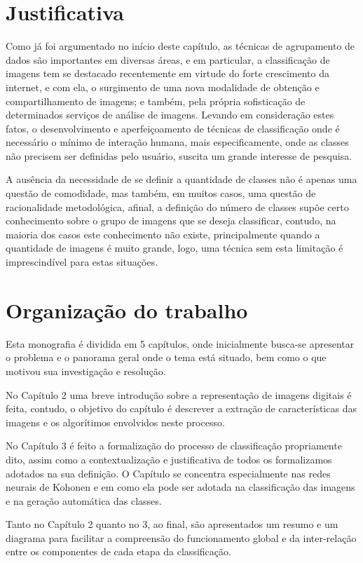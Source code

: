 \section{Justificativa}

Como já foi argumentado no início deste capítulo, as técnicas de agrupamento de
dados são importantes em diversas áreas, e em particular, a classificação de
imagens tem se destacado recentemente em virtude do forte crescimento da
internet, e com ela, o surgimento de uma nova modalidade de obtenção e
compartilhamento de imagens; e também, pela própria sofisticação de determinados
serviços de análise de imagens. Levando em consideração estes fatos, o
desenvolvimento e aperfeiçoamento de técnicas de classificação onde é necessário
o mínimo de interação humana, mais especificamente, onde as classes não precisem
ser definidas pelo usuário, suscita um grande interesse de pesquisa.

A ausência da necessidade de se definir a quantidade de classes não é apenas
uma questão de comodidade, mas também, em muitos casos, uma questão de
racionalidade metodológica, afinal, a definição do número de classes supõe certo
conhecimento sobre o grupo de imagens que se deseja classificar, contudo, na
maioria dos casos este conhecimento não existe, principalmente quando a
quantidade de imagens é muito grande, logo, uma técnica sem esta limitação é
imprescindível para estas situações.

\section{Organização do trabalho}

Esta monografia é dividida em 5 capítulos, onde inicialmente busca-se apresentar o
problema e o panorama geral onde o tema está situado, bem como o que motivou sua
investigação e resolução.

No Capítulo 2 uma breve introdução sobre a representação de imagens digitais é
feita, contudo, o objetivo do capítulo é descrever a extração de características
das imagens e os algorítimos envolvidos neste processo.

No Capítulo 3 é feito a formalização do processo de classificação propriamente
dito, assim como a contextualização e justificativa de todos os formalizamos
adotados na sua definição. O Capítulo se concentra especialmente nas redes
neurais de Kohonen e em como ela pode ser adotada na classificação das imagens
e na geração automática das classes.

Tanto no Capítulo 2 quanto no 3, ao final, são apresentados um resumo e um
diagrama para facilitar a compreensão do funcionamento global e da inter-relação
entre os componentes de cada etapa da classificação.

